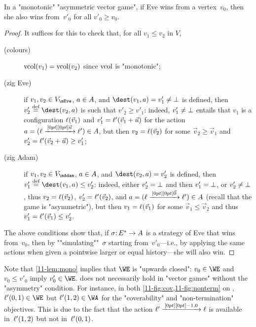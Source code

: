 \begin{lemma}[Simulation]
\label{11-lem:mono}
  In a "monotonic" "asymmetric vector game", if Eve wins from a
  vertex~$v_0$, then she also wins from~$v'_0$ for all $v'_0\geq
  v_0$.
\end{lemma}
\begin{proof}
  It suffices for this to check that, for all $v_1\leq v_2$ in $V$,
  \begin{description}
  \item[(colours)] $\mathrm{vcol}(v_1)=\mathrm{vcol}(v_2)$ since $\mathrm{vcol}$ is "monotonic";
  \item[(zig Eve)] if $v_1,v_2\in V_\mEve$, $a\in A$, and
    $\dest(v_1,a)=v'_1\neq\sink$ is defined, then
    $v'_2\eqdef\dest(v_2,a)$ is such that $v'_2\geq v'_1$: indeed,
    $v'_1\neq\bot$ entails that $v_1$ is a configuration
    $\ell(\vec v_1)$ and $v'_1=\ell'(\vec v_1+\vec u)$ for the action
    $a=(\ell\xrightarrow{\,[0pt][0pt]{\scriptsize{\vec u}}\,}\ell')\in A$, but then $v_2=\ell(\vec v_2)$
    for some $\vec v_2\geq\vec v_1$ and
    $v'_2=\ell'(\vec v_2+\vec u)\geq v'_1$;
  \item[(zig Adam)] if $v_1,v_2\in V_\mAdam$, $a\in A$, and
    $\dest(v_2,a)=v'_2$ is defined, then
    $v'_1\eqdef\dest(v_1,a)\leq v'_2$: indeed, either $v'_2=\bot$ and
    then $v'_1=\bot$, or $v'_2\neq\bot$, thus
    $v_2=\ell(\vec v_2)$, $v'_2=\ell'(\vec v_2)$, and
    $a=(\ell\xrightarrow{\,[0pt][0pt]{\scriptsize{\vec 0}}\,}\ell')\in A$ (recall that the game is
    "asymmetric"), but then $v_1=\ell(\vec v_1)$ for some
    $\vec v_1\leq\vec v_2$ and thus $v'_1=\ell'(\vec v_1)\leq v'_2$.
  \end{description}
  The above conditions show that, if $\sigma{:}\,E^\ast\to A$ is a
  strategy of Eve that wins from~$v_0$, then by
  ""simulating""~$\sigma$ starting from~$v'_0$---i.e., by applying the
  same actions when given a pointwise larger or equal history---she
  will also win.
\end{proof}

Note that \cref{11-lem:mono} implies that $\WE$ is "upwards closed":
$v_0\in\WE$ and $v_0\leq v'_0$ imply $v_0'\in\WE$.  
does not necessarily hold in "vector games" without the "asymmetry"
condition.  For instance, in both \cref{11-fig:cov,11-fig:nonterm} on
, $\loc'(0,1)\in\WE$ but $\loc'(1,2)\in\WA$ for
the "coverability" and "non-termination" objectives.  This is due to
the fact that the action $\ell'\xrightarrow{\,[0pt][0pt]{\scriptsize{-1,0}}\,}\ell$ is available
in~$\ell'(1,2)$ but not in~$\ell'(0,1)$.


